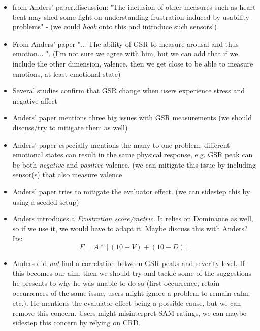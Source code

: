 \begin{itemize}
    \item from Anders' paper.discussion: "The inclusion of other measures such as heart
        beat may shed some light on understanding frustration induced by
        usability problems" - (we could \textit{hook} onto this and introduce such
        sensors!)
    \item From Anders' paper "... The ability of GSR to measure arousal and thus emotion... ". (I'm not sure we agree with him, but we can add that if we include the other dimension, valence, then we get close to be able to measure emotions, at least emotional state)
    \item Several studies confirm that GSR change when users experience stress and negative affect
    \item Anders' paper mentions three big issues with GSR measurements (we should discuss/try to mitigate them as well)
    \item Anders' paper especially mentions the many-to-one problem: different emotional states can result in the same physical response, e.g. GSR peak can be both \textit{negative} and \textit{positive} valence. (we can mitigate this issue by including sensor(s) that also measure valence
    \item Anders' paper tries to mitigate the evaluator effect. (we can sidestep this by using a seeded setup)
    \item Anders introduces a \textit{Frustration score/metric}. It relies on Dominance as well, so if we use it, we would have to adapt it. Maybe discuss this with Anders? Its: \[F = A * [(10-V) + (10-D)]\]

    \item Anders did \textit{not} find a correlation between GSR peaks and
        severity level. If this becomes our aim, then we should try and tackle
        some of the suggestions he presents to why he was unable to do so
        (first occurrence, retain occurrences of the same issue, users might
        ignore a problem to remain calm, etc.). He mentions the evaluator
        effect being a possible cause, but we can remove this concern. Users
        might misinterpret SAM ratings, we can maybe sidestep this concern by
        relying on CRD.
\end{itemize}
